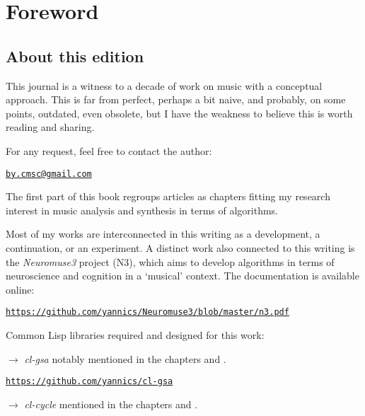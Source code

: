 \frontmatter
\def\thepage{\arabic{page}}
\setcounter{page}{3}

\chapter*{Foreword}
\thispagestyle{empty}

\section*{About this edition}
\label{ate}

\bigskip
This journal is a witness to a decade of work on music with a conceptual approach. 
This is far from perfect, perhaps a bit naive, and probably, on some points, outdated, even obsolete, but I have the weakness to believe this is worth reading and sharing.

\bigskip
\bigskip

For any request, feel free to contact the author: 

\smallskip

\quad \quad \href{mailto:jby.cmsc@gmail.com}{\texttt{by.cmsc@gmail.com}}

\bigskip
\bigskip

The first part of this book regroups articles as chapters fitting my research interest in music analysis and synthesis in terms of algorithms. 
\smallskip

Most of my works are interconnected in this writing as a development, a continuation, or an experiment. A distinct work also connected to this writing  
 is the \textsl{Neuromuse3} project (N3), which aims to develop algorithms in terms of neuroscience and cognition in a `musical' context. The documentation is available online:

\href{https://github.com/yannics/Neuromuse3/blob/master/n3.pdf}{\texttt{\small https://github.com/yannics/Neuromuse3/blob/master/n3.pdf}}

\bigskip
\bigskip
Common Lisp libraries required and designed for this work:

\smallskip

\noindent $\rightarrow$ \textsl{cl-gsa} notably mentioned in the chapters \textsl{} and \textsl{}.

\href{https://github.com/yannics/cl-gsa}{\texttt{\small https://github.com/yannics/cl-gsa}}

\smallskip

\noindent $\rightarrow$ \textsl{cl-cycle} mentioned in the chapters \textsl{} and  \textsl{}. 

